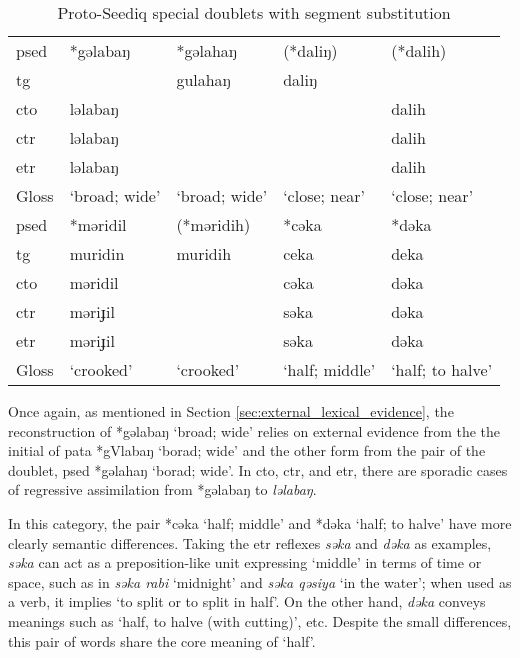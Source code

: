 \begin{table}[!htbp]
\centering
\caption{Proto-Seediq special doublets with segment substitution}
\label{tab:doublet_seg_sub}
\begin{tabular}{lllll}
\hline
\acs{psed} & *gəlabaŋ & *gəlahaŋ   & (*daliŋ) & (*dalih) \\ \hdashline
\acs{tg}   &          & gulahaŋ    & daliŋ    &          \\
\acs{cto}  & ləlabaŋ  &            &          & dalih    \\
\acs{ctr}  & ləlabaŋ  &            &          & dalih    \\
\acs{etr}  & ləlabaŋ  &            &          & dalih    \\
Gloss & `broad; wide'  & `broad; wide'       & `close; near'              & `close; near' \\ \hline\hline
\acs{psed} & *məridil & (*məridih) & *cəka    & *dəka    \\ \hdashline
\acs{tg}   & muridin  & muridih    & ceka     & deka     \\
\acs{cto}  & məridil  &            & cəka     & dəka     \\
\acs{ctr}  & məriɟil  &            & səka     & dəka     \\
\acs{etr}  & məriɟil  &            & səka     & dəka     \\
Gloss & `crooked' & `crooked' & `half; middle' & `half; to halve'     \\ \hline
\end{tabular}
\end{table}

Once again, as mentioned in Section \ref{sec:external_lexical_evidence}, the reconstruction of *gəlabaŋ `broad; wide' relies on external evidence from the the initial of \acl{pata} *gVlabaŋ `borad; wide' and the other form from the pair of the doublet, \acl{psed} *gəlahaŋ `borad; wide'. In \acl{cto}, \acl{ctr}, and \acl{etr}, there are sporadic cases of regressive assimilation from *gəlabaŋ to \textit{ləlabaŋ}.

In this category, the pair *cəka `half; middle' and *dəka `half; to halve' have more clearly semantic differences. Taking the \acl{etr} reflexes \textit{səka} and \textit{dəka} as examples, \textit{səka} can act as a preposition-like unit expressing `middle' in terms of time or space, such as in \textit{səka rabi} `midnight' and \textit{səka qəsiya} `in the water'; when used as a verb, it implies `to split or to split in half'. On the other hand, \textit{dəka} conveys meanings such as `half, to halve (with cutting)', etc. Despite the small differences, this pair of words share the core meaning of `half'.

